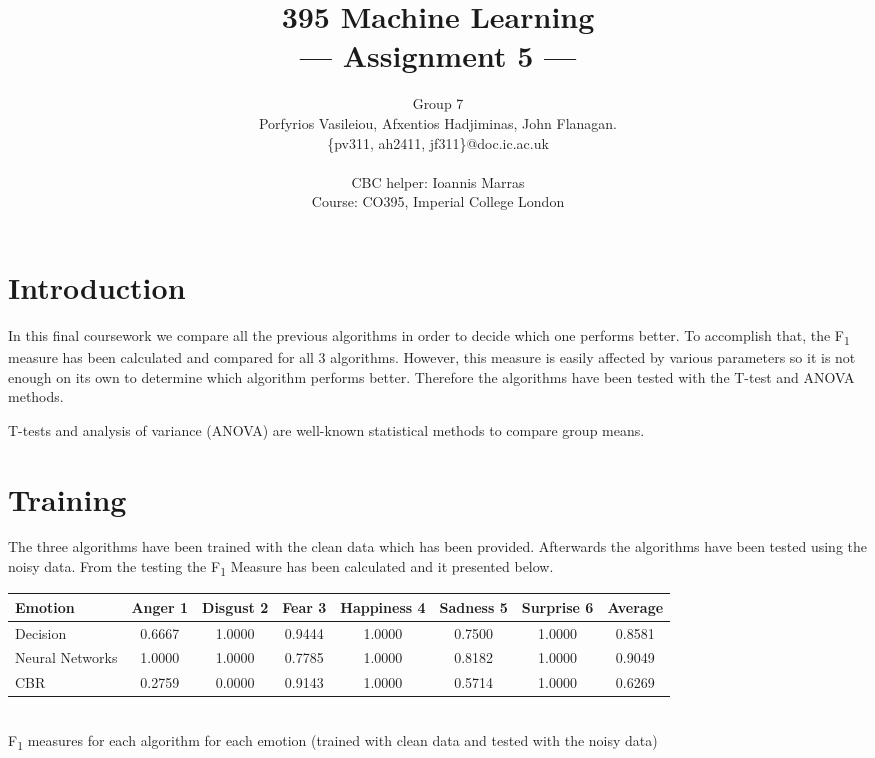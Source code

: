 \documentclass[a4paper,11pt]{article}
\title{395 Machine Learning\\\Large{--- Assignment 5 ---}}
\author{Group 7\\Porfyrios Vasileiou, Afxentios Hadjiminas, John Flanagan.\\
       \{pv311, ah2411, jf311\}@doc.ic.ac.uk\\ \\
       \small{CBC helper: Ioannis Marras}\\
       \small{Course: CO395, Imperial College London}
}
\begin{document}
\maketitle

\section{Introduction}

In this final coursework we compare all the previous algorithms in order to
decide which one performs better. To accomplish that, the F\textsubscript{1} measure has been
calculated and compared for all 3 algorithms. However, this measure is
easily affected by various parameters so it is not enough on its own to
determine which algorithm performs better. Therefore the algorithms have been
tested with the T-test and ANOVA methods. 

T-tests and analysis of variance (ANOVA) are well-known statistical methods to
compare group means.

\section{Training}

The three algorithms have been trained with the clean data which has been
provided. Afterwards the algorithms have been tested using the noisy data. From
the testing the F\textsubscript{1}  Measure has been calculated and it
presented below.

\begin{center}
    \begin{tabular}{| l || c | c | c | c | c | c | c | } \hline
        Emotion & Anger 1 & Disgust 2 & Fear 3 & Happiness 4 & Sadness 5 & Surprise 6  & Average \\ \hline \hline
        Decision & 0.6667  & 1.0000 & 0.9444 & 1.0000 & 0.7500  & 1.0000 & 0.8581\\ \hline
        Neural Networks & 1.0000 & 1.0000 & 0.7785 & 1.0000 & 0.8182 & 1.0000 & 0.9049 \\ \hline
        CBR & 0.2759  &  0.0000 &  0.9143 & 1.0000 & 0.5714 &  1.0000 & 0.6269 \\ \hline
    \end{tabular}\vspace{5pt}\\
    F\textsubscript{1} measures for each algorithm for each emotion (trained with clean data  and tested with the noisy data)
    \end{center}
\end{document}
